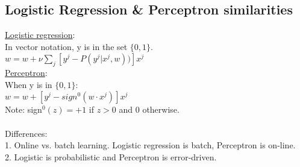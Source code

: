 \subsection{Logistic Regression \& Perceptron similarities}
\underline{Logistic regression}:  \hfill \\
In vector notation, y is in the set $\{ 0, 1\}$. \hfill \\
$w = w + \nu \sum_j [y^j - P(y^j | x^j, w))] x^j$ \hfill \\

\underline{Perceptron}:  \hfill \\
When y is in $\{ 0, 1\}$: \hfill \\
$w = w + [y^j - sign^0(w \cdot x^j)] x^j$  \hfill \\
Note: sign$^0(z) =  + 1$ if $z > 0$ and 0 otherwise.  \hfill \\
\hfill \\
Differences:   \hfill \\
1. Online vs. batch learning.  Logistic regression is batch, Perceptron is on-line.  \hfill \\
2. Logistic is probabilistic and Perceptron is error-driven. 
 


